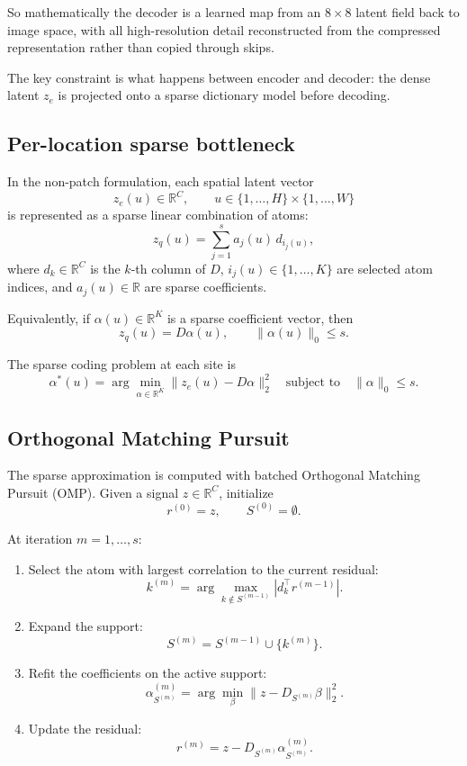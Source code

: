 \documentclass[11pt]{article}
\newcommand{\R}{\mathbb{R}}
\begin{document}
So mathematically the decoder is a learned map from an $8 \times 8$ latent field back to image space, with all high-resolution detail reconstructed from the compressed representation rather than copied through skips.

The key constraint is what happens between encoder and decoder: the dense latent $z_e$ is projected onto a sparse dictionary model before decoding.

\subsection{Per-location sparse bottleneck}

In the non-patch formulation, each spatial latent vector
\[
z_e(u) \in \R^C, \qquad u \in \{1,\dots,H\} \times \{1,\dots,W\}
\]
is represented as a sparse linear combination of atoms:
\[
z_q(u) = \sum_{j=1}^{s} a_j(u)\, d_{i_j(u)},
\]
where $d_k \in \R^C$ is the $k$-th column of $D$, $i_j(u) \in \{1,\dots,K\}$ are selected atom indices, and $a_j(u) \in \R$ are sparse coefficients.

Equivalently, if $\alpha(u) \in \R^K$ is a sparse coefficient vector, then
\[
z_q(u) = D \alpha(u), \qquad \|\alpha(u)\|_0 \le s.
\]

The sparse coding problem at each site is
\[
\alpha^*(u)
=
\arg\min_{\alpha \in \R^K}
\|z_e(u) - D\alpha\|_2^2
\quad
\text{subject to}
\quad
\|\alpha\|_0 \le s.
\]

\subsection{Orthogonal Matching Pursuit}

The sparse approximation is computed with batched Orthogonal Matching Pursuit (OMP). Given a signal $z \in \R^C$, initialize
\[
r^{(0)} = z, \qquad S^{(0)} = \emptyset.
\]

At iteration $m = 1,\dots,s$:
\begin{enumerate}
  \item Select the atom with largest correlation to the current residual:
  \[
  k^{(m)} = \arg\max_{k \notin S^{(m-1)}} |d_k^\top r^{(m-1)}|.
  \]
  \item Expand the support:
  \[
  S^{(m)} = S^{(m-1)} \cup \{k^{(m)}\}.
  \]
  \item Refit the coefficients on the active support:
  \[
  \alpha_{S^{(m)}}^{(m)}
  =
  \arg\min_{\beta}
  \|z - D_{S^{(m)}} \beta\|_2^2.
  \]
  \item Update the residual:
  \[
  r^{(m)} = z - D_{S^{(m)}} \alpha_{S^{(m)}}^{(m)}.
  \]
\end{enumerate}
\end{document}
